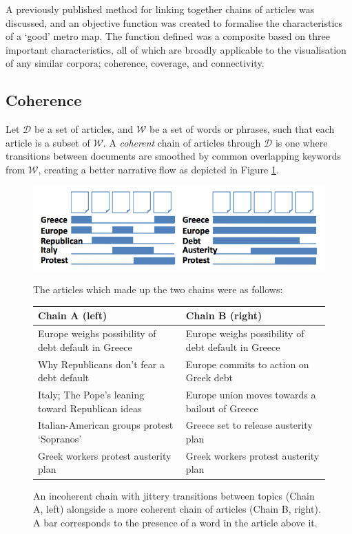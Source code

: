 A previously published method \citep{ConnectingTheDots} for linking together chains of articles  was discussed, and an objective function was created to formalise the characteristics of a `good' metro map. The function defined was a composite based on three important characteristics, all of which are broadly applicable to the visualisation of any similar corpora; coherence, coverage, and connectivity.

\subsection{Coherence}
Let $\mathcal{D}$ be a set of articles, and $\mathcal{W}$ be a set of words or phrases, such that each article is a subset of $\mathcal{W}$. A \textit{coherent} chain of articles through $\mathcal{D}$ is one where transitions between documents are smoothed by common overlapping keywords from $\mathcal{W}$, creating a better narrative flow \citep{ConnectingTheDots} as depicted in Figure \ref{fig:coverage}.

\begin{figure}[htbp!]
	\centering
	\includegraphics[width=.7\textwidth]{img/lit-survey/coverage.png} \par
	 \scriptsize{The articles which made up the two chains were as follows:\\[0.2cm]
	 \begin{tabular}{|l|l|}
	 	\hline 
	 	Chain A (left) & Chain B (right) \\
	 	\hline
	 	Europe weighs possibility of debt default in Greece & Europe weighs possibility of debt default in Greece \\
	 	Why Republicans don't fear a debt default & Europe commits to action on Greek debt \\
	 	Italy; The Pope's leaning toward Republican ideas & Europe union moves towards a bailout of Greece \\
	 	Italian-American groups protest `Sopranos' & Greece set to release austerity plan \\
	 	Greek workers protest austerity plan & Greek workers protest austerity plan \\
	 	\hline
	 \end{tabular}}
	 \caption{An incoherent chain with jittery transitions between topics (Chain A, left) alongside a more coherent chain of articles (Chain B, right). A bar corresponds to the presence of a word in the article above it. \citep{GeneratingInformationMaps}}
	\label{fig:coverage}
\end{figure}

